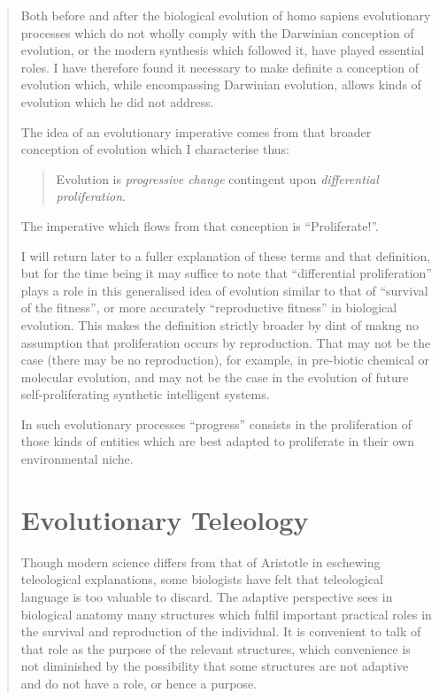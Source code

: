 {\begin{quote}
Both before and after the biological evolution of homo sapiens evolutionary processes which do not wholly comply with the Darwinian conception of evolution, or the modern synthesis which followed it, have played essential roles.
I have therefore found it necessary to make definite a conception of evolution which, while encompassing Darwinian evolution, allows kinds of evolution which he did not address.

The idea of an evolutionary imperative comes from that broader conception of evolution which I characterise thus:

\begin{quote}
Evolution is \emph{progressive change} contingent upon \emph{differential proliferation}.
\end{quote}

The imperative which flows from that conception is ``Proliferate!''.

I will return later to a fuller explanation of these terms and that definition, but for the time being it may suffice to note that ``differential proliferation'' plays a role in this generalised idea of evolution similar to that of ``survival of the fitness'', or more accurately ``reproductive fitness'' in biological evolution.
This makes the definition strictly broader by dint of makng no assumption that proliferation occurs by reproduction.
That may not be the case (there may be no reproduction), for example, in pre-biotic chemical or molecular evolution, and may not be the case in the evolution of future self-proliferating synthetic intelligent systems.

In such evolutionary processes ``progress'' consists in the proliferation of those kinds of entities which are best adapted to proliferate in their own environmental niche.

\section{Evolutionary Teleology}

Though modern science differs from that of Aristotle in eschewing teleological explanations, some biologists have felt that teleological language is too valuable to discard.
The adaptive perspective sees in biological anatomy many structures which fulfil important practical roles in the survival and reproduction of the individual.
It is convenient to talk of that role as the purpose of the relevant structures, which convenience is not diminished by the possibility that some structures are not adaptive and do not have a role, or hence a purpose.


\end{quote}}
